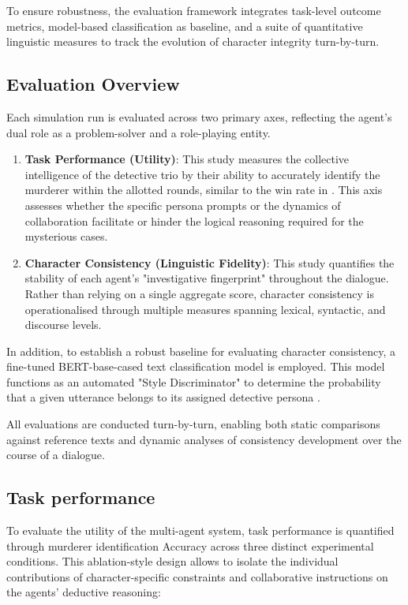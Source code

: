 \documentclass{article}
\begin{document}
To ensure robustness, the evaluation framework integrates task-level outcome metrics, model-based classification as baseline, and a suite of quantitative linguistic measures to track the evolution of character integrity turn-by-turn.

\subsection{Evaluation Overview}

Each simulation run is evaluated across two primary axes, reflecting the agent's dual role as a problem-solver and a role-playing entity.

\begin{enumerate}
    \item \textbf{Task Performance (Utility)}: This study measures the collective intelligence of the detective trio by their ability to accurately identify the murderer within the allotted rounds, similar to the win rate in \cite{zhu2024player}. This axis assesses whether the specific persona prompts or the dynamics of collaboration facilitate or hinder the logical reasoning required for the mysterious cases.
    \item \textbf{Character Consistency (Linguistic Fidelity)}: This study quantifies the stability of each agent's "investigative fingerprint" throughout the dialogue. Rather than relying on a single aggregate score, character consistency is operationalised through multiple measures spanning lexical, syntactic, and discourse levels.
\end{enumerate}

In addition, to establish a robust baseline for evaluating character consistency, a fine-tuned BERT-base-cased text classification model is employed. This model functions as an automated "Style Discriminator" to determine the probability that a given utterance belongs to its assigned detective persona \citep{wang2024character100}.

All evaluations are conducted turn-by-turn, enabling both static comparisons against reference texts and dynamic analyses of consistency development over the course of a dialogue.

\subsection{Task performance}

To evaluate the utility of the multi-agent system, task performance is quantified through murderer identification Accuracy across three distinct experimental conditions. This ablation-style design allows to isolate the individual contributions of character-specific constraints and collaborative instructions on the agents’ deductive reasoning:
\end{document}
